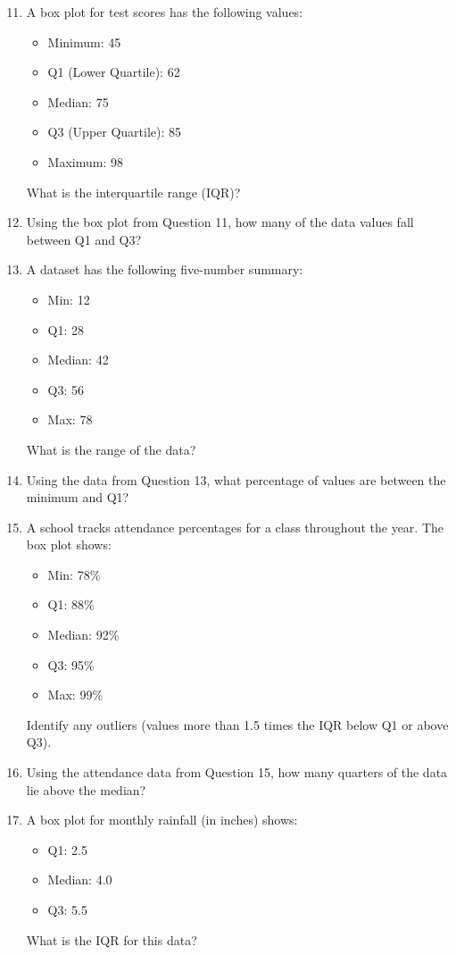 \documentclass[12pt,a4paper]{article}
\begin{document}
\begin{enumerate}
\setcounter{enumi}{10}

\item A box plot for test scores has the following values:
\begin{itemize}
    \item Minimum: 45
    \item Q1 (Lower Quartile): 62
    \item Median: 75
    \item Q3 (Upper Quartile): 85
    \item Maximum: 98
\end{itemize}
What is the interquartile range (IQR)?

\item Using the box plot from Question 11, how many of the data values fall between Q1 and Q3?

\item A dataset has the following five-number summary:
\begin{itemize}
    \item Min: 12
    \item Q1: 28
    \item Median: 42
    \item Q3: 56
    \item Max: 78
\end{itemize}
What is the range of the data?

\item Using the data from Question 13, what percentage of values are between the minimum and Q1?

\item A school tracks attendance percentages for a class throughout the year. The box plot shows:
\begin{itemize}
    \item Min: 78\%
    \item Q1: 88\%
    \item Median: 92\%
    \item Q3: 95\%
    \item Max: 99\%
\end{itemize}
Identify any outliers (values more than 1.5 times the IQR below Q1 or above Q3).

\item Using the attendance data from Question 15, how many quarters of the data lie above the median?

\item A box plot for monthly rainfall (in inches) shows:
\begin{itemize}
    \item Q1: 2.5
    \item Median: 4.0
    \item Q3: 5.5
\end{itemize}
What is the IQR for this data?


\end{enumerate}
\end{document}
